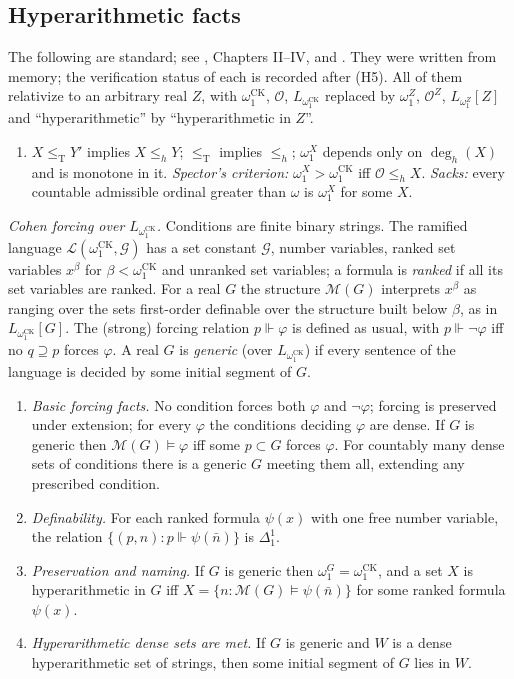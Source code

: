 \documentclass[11pt,letterpaper]{article}
\theoremstyle{definition}
\numberwithin{equation}{section}
\newcommand{\leT}{\le_{\mathrm T}}
\newcommand{\leh}{\le_{h}}
\newcommand{\Dh}{\Delta^1_1}
\newcommand{\degh}{\deg_h}
\newcommand{\omck}{\omega_1^{\mathrm{CK}}}
\newcommand{\KO}{\mathcal O}
\newcommand{\forces}{\Vdash}
\begin{document}
\subsection{Hyperarithmetic facts}\label{sec:facts}
The following are standard; see \cite{SacksHRT}, Chapters II--IV, and \cite{Feferman}. They were written from memory; the verification status of each is recorded after (H5). All of them relativize to an arbitrary real $Z$, with $\omck$, $\KO$, $L_{\omck}$ replaced by $\omega_1^Z$, $\KO^Z$, $L_{\omega_1^Z}[Z]$ and ``hyperarithmetic'' by ``hyperarithmetic in $Z$''.
\begin{enumerate}[label=\textup{(H\arabic*)},leftmargin=3em]
\item $X\leT Y'$ implies $X\leh Y$; $\leT$ implies $\leh$; $\omega_1^X$ depends only on $\degh(X)$ and is monotone in it. \emph{Spector's criterion:} $\omega_1^X>\omck$ iff $\KO\leh X$. \emph{Sacks:} every countable admissible ordinal greater than $\omega$ is $\omega_1^X$ for some $X$.
\end{enumerate}
\emph{Cohen forcing over $L_{\omck}$.} Conditions are finite binary strings. The ramified language $\mathcal L(\omck,\mathcal G)$ has a set constant $\mathcal G$, number variables, ranked set variables $x^\beta$ for $\beta<\omck$ and unranked set variables; a formula is \emph{ranked} if all its set variables are ranked. For a real $G$ the structure $\mathcal M(G)$ interprets $x^\beta$ as ranging over the sets first-order definable over the structure built below $\beta$, as in $L_{\omck}[G]$. The (strong) forcing relation $p\forces\varphi$ is defined as usual, with $p\forces\neg\varphi$ iff no $q\supseteq p$ forces $\varphi$. A real $G$ is \emph{generic} (over $L_{\omck}$) if every sentence of the language is decided by some initial segment of $G$.
\begin{enumerate}[label=\textup{(H\arabic*)},leftmargin=3em,resume]
\item \emph{Basic forcing facts.} No condition forces both $\varphi$ and $\neg\varphi$; forcing is preserved under extension; for every $\varphi$ the conditions deciding $\varphi$ are dense. If $G$ is generic then $\mathcal M(G)\models\varphi$ iff some $p\subset G$ forces $\varphi$. For countably many dense sets of conditions there is a generic $G$ meeting them all, extending any prescribed condition.
\item \emph{Definability.} For each ranked formula $\psi(x)$ with one free number variable, the relation $\{(p,n):p\forces\psi(\bar n)\}$ is $\Dh$.
\item \emph{Preservation and naming.} If $G$ is generic then $\omega_1^G=\omck$, and a set $X$ is hyperarithmetic in $G$ iff $X=\{n:\mathcal M(G)\models\psi(\bar n)\}$ for some ranked formula $\psi(x)$.
\item \emph{Hyperarithmetic dense sets are met.} If $G$ is generic and $W$ is a dense hyperarithmetic set of strings, then some initial segment of $G$ lies in $W$.
\end{enumerate}
\end{document}
